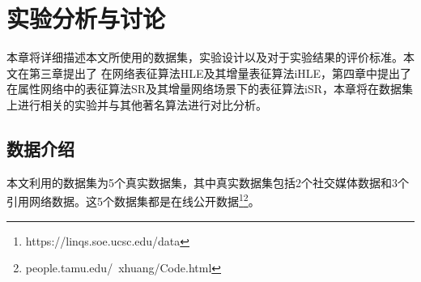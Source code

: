 \chapter{实验分析与讨论}
本章将详细描述本文所使用的数据集，实验设计以及对于实验结果的评价标准。本文在第三章提出了
在网络表征算法HLE及其增量表征算法iHLE，第四章中提出了在属性网络中的表征算法SR及其增量网络场景下的表征算法iSR，本章将在数据集上进行相关的实验并与其他著名算法进行对比分析。

\section{数据介绍}
本文利用的数据集为5个真实数据集，其中真实数据集包括2个社交媒体数据和3个引用网络数据。这5个数据集都是在线公开数据\footnote{https://linqs.soe.ucsc.edu/data}\footnote{people.tamu.edu/~xhuang/Code.html}。

